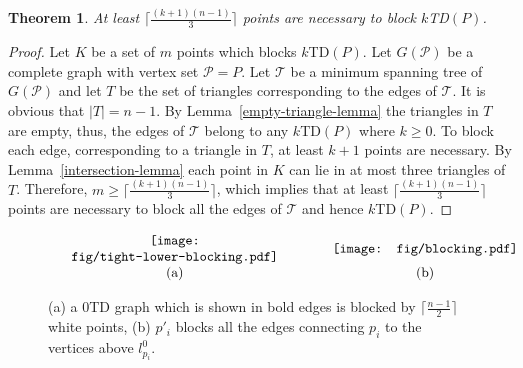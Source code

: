 \documentclass[11pt,a4paper]{article}
\newcommand{\kTD}[2]{$#1$\text{-}TD#2}
\newtheorem{theorem}{Theorem}
\begin{document}
\begin{theorem}
\label{blocking-thr1}
  At least $\lceil\frac{(k+1)(n-1)}{3}\rceil$ points are necessary to block \kTD{k}{$(P)$}.
\end{theorem}
\begin{proof}
Let $K$ be a set of $m$ points which blocks \kTD{k}{$(P)$}. Let $G(\mathcal{P})$ be a complete graph with vertex set $\mathcal{P}=P$. Let $\mathcal{T}$ be a minimum spanning tree of $G(\mathcal{P})$ and let $T$ be the set of triangles corresponding to the edges of $\mathcal{T}$. It is obvious that $|T|=n-1$. By Lemma~\ref{empty-triangle-lemma} the triangles in $T$ are empty, thus, the edges of $\mathcal{T}$ belong to any \kTD{k}{$(P)$} where $k\ge0$. To block each edge, corresponding to a triangle in $T$, at least $k+1$ points are necessary. By Lemma~\ref{intersection-lemma} each point in $K$ can lie in at most three triangles of $T$. Therefore, $m\ge\lceil\frac{(k+1)(n-1)}{3}\rceil$, which implies that at least $\lceil\frac{(k+1)(n-1)}{3}\rceil$ points are necessary to block all the edges of $\mathcal{T}$ and hence \kTD{k}{$(P)$}.
\end{proof}
\begin{figure}[htb]
  \centering
\setlength{\tabcolsep}{0in}
  $\begin{tabular}{cc}
 \multicolumn{1}{m{.5\columnwidth}}{\centering\texttt{[image: fig/tight-lower-blocking.pdf]}}
&\multicolumn{1}{m{.5\columnwidth}}{\centering\texttt{[image: fig/blocking.pdf]}}\\
(a) & (b)
\end{tabular}$
  \caption{(a) a \kTD{0}{} graph which is shown in bold edges is blocked by $\lceil\frac{n-1}{2}\rceil$ white points, (b) $p'_i$ blocks all the edges connecting $p_i$ to the vertices above $l^0_{p_i}$.}
\label{blocking-fig}
\end{figure}
\end{document}
